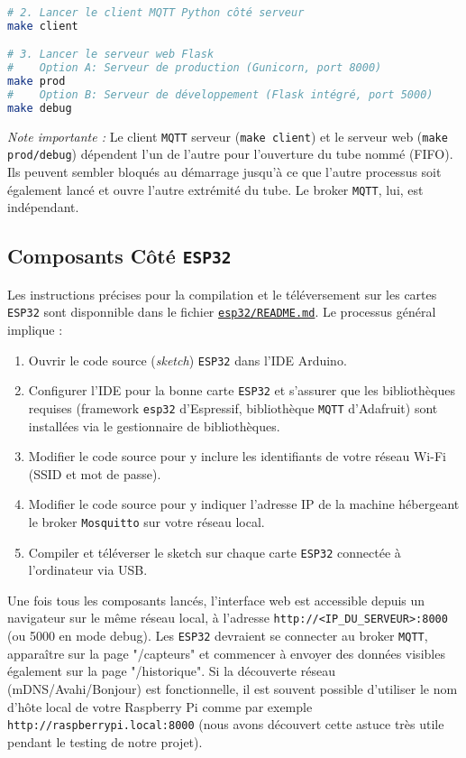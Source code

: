 \documentclass[12pt]{article}
\begin{document}
\begin{enumerate}
\begin{lstlisting}[language=bash]
# 2. Lancer le client MQTT Python côté serveur
make client

# 3. Lancer le serveur web Flask
#    Option A: Serveur de production (Gunicorn, port 8000)
make prod
#    Option B: Serveur de développement (Flask intégré, port 5000)
make debug
        \end{lstlisting}
        \textit{Note importante :} Le client \texttt{MQTT} serveur (\texttt{make client}) et le serveur web (\texttt{make prod/debug}) dépendent l'un de l'autre pour l'ouverture du tube nommé (FIFO). Ils peuvent sembler bloqués au démarrage jusqu'à ce que l'autre processus soit également lancé et ouvre l'autre extrémité du tube. Le broker \texttt{MQTT}, lui, est indépendant.
\end{enumerate}

\subsection{Composants Côté \texttt{ESP32}}

Les instructions précises pour la compilation et le téléversement sur les cartes \texttt{ESP32} sont disponnible dans le fichier \href{https://github.com/GreengagePlum/Project-IOT/blob/v1.0.0/esp32/README.md}{\texttt{esp32/README.md}}. Le processus général implique :
\begin{enumerate}
    \item Ouvrir le code source (\textit{sketch}) \texttt{ESP32} dans l'IDE Arduino.
    \item Configurer l'IDE pour la bonne carte \texttt{ESP32} et s'assurer que les bibliothèques requises (framework \texttt{esp32} d'Espressif, bibliothèque \texttt{MQTT} d'Adafruit) sont installées via le gestionnaire de bibliothèques.
    \item Modifier le code source pour y inclure les identifiants de votre réseau Wi-Fi (SSID et mot de passe).
    \item Modifier le code source pour y indiquer l'adresse IP de la machine hébergeant le broker \texttt{Mosquitto} sur votre réseau local.
    \item Compiler et téléverser le sketch sur chaque carte \texttt{ESP32} connectée à l'ordinateur via USB.
\end{enumerate} \hfill \break

Une fois tous les composants lancés, l'interface web est accessible depuis un navigateur sur le même réseau local, à l'adresse \texttt{http://<IP\_DU\_SERVEUR>:8000} (ou 5000 en mode debug). Les \texttt{ESP32} devraient se connecter au broker \texttt{MQTT}, apparaître sur la page "/capteurs" et commencer à envoyer des données visibles également sur la page "/historique". Si la découverte réseau (mDNS/Avahi/Bonjour) est fonctionnelle, il est souvent possible d'utiliser le nom d'hôte local de votre Raspberry Pi comme par exemple \texttt{http://raspberrypi.local:8000} (nous avons découvert cette astuce très utile pendant le testing de notre projet).
\end{document}
